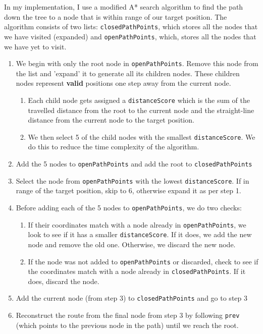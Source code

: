 \documentclass[11pt]{article}
\begin{document}
In my implementation, I use a modified A* search algorithm to find the path down the tree to a node that is within range of our target position. The algorithm consists of two lists: \texttt{closedPathPoints}, which stores all the nodes that we have visited (expanded) and \texttt{openPathPoints}, which, stores all the nodes that we have yet to visit.
\begin{enumerate}[topsep=0pt, itemsep=0pt]
  \item We begin with only the root node in \texttt{openPathPoints}. Remove this node from the list and 'expand' it to generate all its children nodes. These children nodes represent \textbf{valid} positions one step away from the current node.
  \begin{enumerate}[topsep=0pt, itemsep=0pt]
      \item Each child node gets assigned a \texttt{distanceScore} which is the sum of the travelled distance from the root to the current node and the straight-line distance from the current node to the target position.
      \item We then select 5 of the child nodes with the smallest \texttt{distanceScore}. We do this to reduce the time complexity of the algorithm.
  \end{enumerate}
  
  \item Add the 5 nodes to \texttt{openPathPoints} and add the root to \texttt{closedPathPoints}
  
  \item Select the node from \texttt{openPathPoints} with the lowest \texttt{distanceScore}. If in range of the target position, skip to 6, otherwise expand it as per step 1.
  
  \item Before adding each of the 5 nodes to \texttt{openPathPoints}, we do two checks:
  \begin{enumerate}[topsep=0pt, itemsep=0pt]
      \item If their coordinates match with a node already in \texttt{openPathPoints}, we look to see if it has a smaller \texttt{distanceScore}. If it does, we add the new node and remove the old one. Otherwise, we discard the new node.
      \item If the node was not added to \texttt{openPathPoints} or discarded, check to see if the coordinates match with a node already in \texttt{closedPathPoints}. If it does, discard the node.      
    \end{enumerate}   
    
  \item Add the current node (from step 3) to \texttt{closedPathPoints} and go to step 3

  \item Reconstruct the route from the final node from step 3 by following \texttt{prev} (which points to the previous node in the path) until we reach the root.
\end{enumerate}
\end{document}
